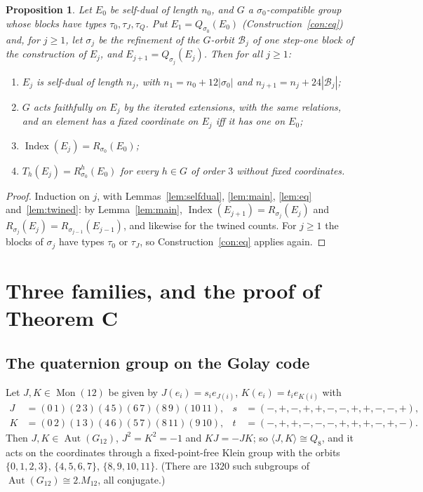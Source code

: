 \documentclass[11pt]{amsart}
\newtheorem{proposition}[theorem]{Proposition}
\theoremstyle{definition}
\newcommand{\Index}{\operatorname{Index}}
\newcommand{\Aut}{\operatorname{Aut}}
\newcommand{\Mon}{\operatorname{Mon}}
\newcommand{\cB}{\mathcal{B}}
\begin{document}
\begin{proposition}\label{prop:chain}
Let $E_0$ be self-dual of length $n_0$, and $G$ a $\sigma_0$-compatible group whose blocks have types
$\tau_0,\tau_J,\tau_Q$. Put $E_1=Q_{\sigma_0}(E_0)$ (Construction~\ref{con:eq}) and, for $j\ge1$,
let $\sigma_j$ be the refinement of the $G$-orbit $\cB_j$ of one step-one block of the construction
of $E_j$, and $E_{j+1}=Q_{\sigma_j}(E_j)$. Then for all $j\ge1$:
\begin{enumerate}
\item $E_j$ is self-dual of length $n_j$, with $n_1=n_0+12|\sigma_0|$ and $n_{j+1}=n_j+24|\cB_j|$;
\item $G$ acts faithfully on $E_j$ by the iterated extensions, with the same relations, and an
  element has a fixed coordinate on $E_j$ iff it has one on $E_0$;
\item $\Index(E_j)=R_{\sigma_0}(E_0)$;
\item $T_h(E_j)=R^h_{\sigma_0}(E_0)$ for every $h\in G$ of order $3$ without fixed coordinates.
\end{enumerate}
\end{proposition}

\begin{proof}
Induction on $j$, with Lemmas~\ref{lem:selfdual}, \ref{lem:main}, \ref{lem:eq}
and~\ref{lem:twined}: by Lemma~\ref{lem:main}, $\Index(E_{j+1})=R_{\sigma_j}(E_j)$ and
$R_{\sigma_j}(E_j)=R_{\sigma_{j-1}}(E_{j-1})$, and likewise for the twined counts. For $j\ge1$ the blocks of $\sigma_j$ have types $\tau_0$ or $\tau_J$, so
Construction~\ref{con:eq} applies again.
\end{proof}

\section{Three families, and the proof of Theorem C}\label{sec:families}

\subsection{The quaternion group on the Golay code}\label{sec:Qfamily}
Let $J,K\in\Mon(12)$ be given by $J(e_i)=s_ie_{J(i)}$, $K(e_i)=t_ie_{K(i)}$ with
\[
\begin{aligned}
J&=(0\,1)(2\,3)(4\,5)(6\,7)(8\,9)(10\,11), & s&=(-,+,-,+,+,-,-,+,+,-,-,+),\\
K&=(0\,2)(1\,3)(4\,6)(5\,7)(8\,11)(9\,10), & t&=(-,+,+,-,-,-,+,+,+,-,+,-).
\end{aligned}
\]
Then $J,K\in\Aut(G_{12})$, $J^2=K^2=-1$ and $KJ=-JK$; so $\langle J,K\rangle\cong Q_8$, and it acts
on the coordinates through a fixed-point-free Klein group with the orbits $\{0,1,2,3\}$,
$\{4,5,6,7\}$, $\{8,9,10,11\}$. (There are $1320$ such subgroups of $\Aut(G_{12})\cong2.M_{12}$, all
conjugate.)
\end{document}
